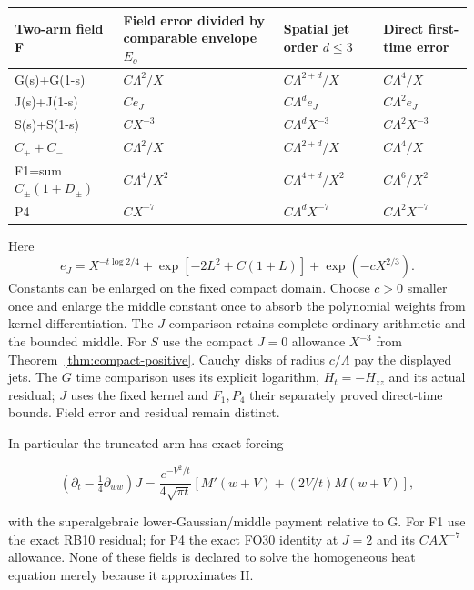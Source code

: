 \begingroup\small
\begin{longtable}{@{}>{\raggedright\arraybackslash}p{} >{\raggedright\arraybackslash}p{} >{\raggedright\arraybackslash}p{} >{\raggedright\arraybackslash}p{}@{}}
\toprule
Two-arm field F & Field error divided by comparable envelope \(E_{o}\) & Spatial jet order \(d\le 3\) & Direct first-time error\\
\midrule
\endhead
G(s)+G(1-s) & \(C \Lambda^{2}/X\) & \(C \Lambda^{2+d}/X\) & \(C \Lambda^{4}/X\)\\
J(s)+J(1-s) & \(C e_{J}\) & \(C \Lambda^{d} e_{J}\) & \(C \Lambda^{2} e_{J}\)\\
S(s)+S(1-s) & \(C X^{-3}\) & \(C \Lambda^{d} X^{-3}\) & \(C \Lambda^{2} X^{-3}\)\\
\(C_++C_-\) & \(C \Lambda^{2}/X\) & \(C \Lambda^{2+d}/X\) & \(C \Lambda^{4}/X\)\\
F1=sum \(C_{\pm}(1+D_{\pm})\) & \(C \Lambda^{4}/X^{2}\) & \(C \Lambda^{4+d}/X^{2}\) & \(C \Lambda^{6}/X^{2}\)\\
P4 & \(C X^{-7}\) & \(C \Lambda^{d} X^{-7}\) & \(C \Lambda^{2} X^{-7}\)\\
\bottomrule
\end{longtable}
\endgroup

Here
\[
 e_J=X^{-t\log2/4}+\exp[-2L^2+C(1+L)]+\exp(-cX^{2/3}).
\]
Constants can be enlarged on the fixed compact domain. Choose $c>0$
smaller once and enlarge the middle constant once to absorb the
polynomial weights from kernel differentiation. The $J$ comparison
retains complete ordinary arithmetic and the bounded middle. For $S$
use the compact $J=0$ allowance $X^{-3}$ from Theorem~\ref{thm:compact-positive}.
Cauchy disks of radius $c/\Lambda$ pay the displayed jets. The $G$
time comparison uses its explicit logarithm, $H_t=-H_{zz}$ and its
actual residual; $J$ uses the fixed kernel and $F_1,P_4$ their
separately proved direct-time bounds. Field error and residual remain distinct.

In particular the truncated arm has exact forcing

\[
(\partial_t-\tfrac14\partial_{ww})J
 =\frac{e^{-V^2/t}}{4\sqrt{\pi t}}
  [M'(w+V)+(2V/t)M(w+V)],
\tag{NC7}\label{eq:ansatz-nc7}
\]

with the superalgebraic lower-Gaussian/middle payment relative to G. For F1 use the exact RB10 residual; for P4 the exact FO30 identity at \(J=2\) and its \(C A X^{-7}\) allowance. None of these fields is declared to solve the homogeneous heat equation merely because it approximates H.

